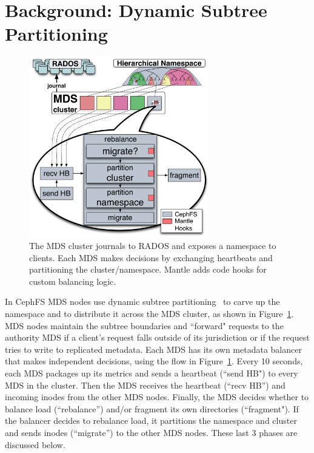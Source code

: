 \section{Background: Dynamic Subtree Partitioning}	%
\label{background_dynamic_subtree_partitioning}			%
\begin{figure}[tb]
	\centering	
	\includegraphics[width=0.7\textwidth]{./chapters/mantle/figures/balancer-diagram.pdf}
 	\caption{The MDS cluster journals to RADOS and exposes a namespace to clients. Each MDS makes decisions by exchanging heartbeats and partitioning the cluster/namespace. Mantle adds code hooks for custom balancing logic.\label{figure:balancer-diagram}}    
\end{figure}   


In CephFS MDS nodes use dynamic subtree partitioning~\cite{weil:sc2004-dyn-metadata} to carve up the namespace and to distribute it across the MDS cluster, as shown in Figure~\ref{figure:balancer-diagram}. MDS nodes maintain the subtree boundaries and ``forward" requests to the authority MDS if a client's request falls outside of its jurisdiction or if the request tries to write to replicated metadata.  Each MDS has its own metadata balancer that makes independent decisions, using the flow in Figure~\ref{figure:balancer-diagram}.  Every 10 seconds, each MDS packages up its metrics and sends a heartbeat (``send HB") to every MDS in the cluster. Then the MDS receives the heartbeat (``recv HB'') and incoming inodes from the other MDS nodes. Finally, the MDS decides whether to balance load (``rebalance'') and/or fragment its own directories (``fragment"). If the balancer decides to rebalance load, it partitions the namespace and cluster and sends inodes (``migrate'') to the other MDS nodes. These last 3 phases are discussed below.

